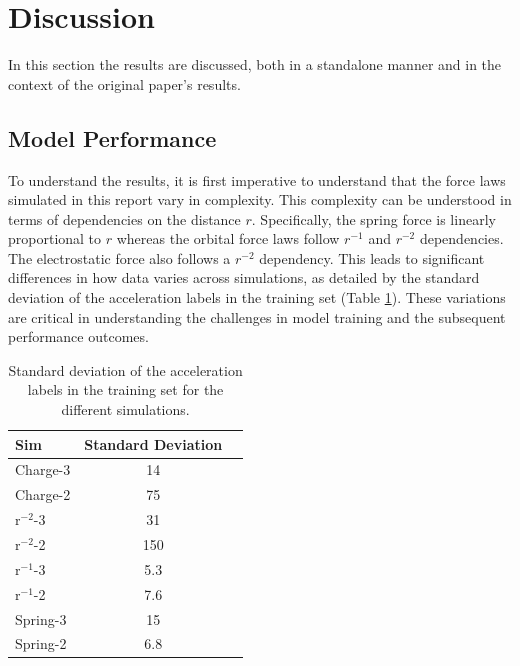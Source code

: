 \documentclass[11pt]{article}
\begin{document}
\section{Discussion}
In this section the results are discussed, both in a standalone manner and in the context of the original paper's results. 
\subsection{Model Performance}
To understand the results, it is first imperative to understand that the force laws simulated in this report vary in complexity. This complexity can be understood in terms of dependencies on the distance \( r \). Specifically, the spring force is linearly proportional to \( r \) whereas the orbital force laws follow \( r^{-1} \) and \( r^{-2} \) dependencies. The electrostatic force also follows a \( r^{-2} \) dependency. This leads to significant differences in how data varies across simulations, as detailed by the standard deviation of the acceleration labels in the training set (Table \ref{tab:std_table}). These variations are critical in understanding the challenges in model training and the subsequent performance outcomes.
\begin{table}[H]
    \centering
    \begin{tabular}{lcc}
    \hline
    Sim & Standard Deviation \\
    \hline
    Charge-3 & 14 \\
    Charge-2 & 75 \\
    r$^{-2}$-3 & 31 \\
    r$^{-2}$-2 & 150 \\
    r$^{-1}$-3 & 5.3 \\
    r$^{-1}$-2 & 7.6 \\
    Spring-3 & 15 \\
    Spring-2 & 6.8 \\
    \hline
    \end{tabular}
    \caption{Standard deviation of the acceleration labels in the training set for the different simulations.}
    \label{tab:std_table}
\end{table}
\end{document}
